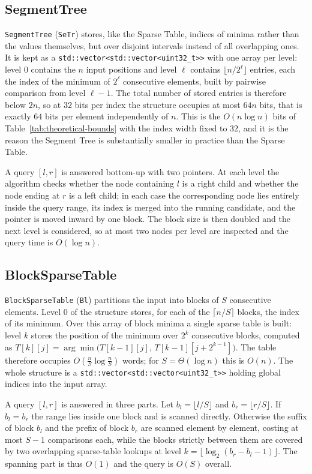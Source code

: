 \documentclass[a4paper,UKenglish,cleveref,thm-restate]{lipics-v2021}
\begin{document}
\subsection{SegmentTree}
\texttt{SegmentTree} (\texttt{SeTr}) stores, like the Sparse Table, indices of minima rather than the values themselves, but over disjoint intervals instead of all overlapping ones.
It is kept as a \texttt{std::vector<std::vector<uint32\_t>{}>} with one array per level:
level $0$ contains the $n$ input positions
and level $\ell$ contains $\lfloor n/2^\ell \rfloor$ entries,
each the index of the minimum of $2^\ell$ consecutive elements, built by pairwise comparison from level $\ell-1$.
The total number of stored entries is therefore below $2n$, so at $32$ bits per index the structure occupies at most $64n$ bits,
that is exactly $64$ bits per element independently of $n$.
This is the $O(n\log n)$ bits of Table~\ref{tab:theoretical-bounds} with the index width fixed to $32$,
and it is the reason the Segment Tree is substantially smaller in practice than the Sparse Table.

A query $[l,r]$ is answered bottom-up with two pointers.
At each level the algorithm checks whether the node containing $l$ is a right child and whether the node ending at $r$ is a left child;
in each case the corresponding node lies entirely inside the query range, its index is merged into the running candidate, and the pointer is moved inward by one block.
The block size is then doubled and the next level is considered, so at most two nodes per level are inspected and the query time is $O(\log n)$.

\subsection{BlockSparseTable}
\texttt{BlockSparseTable} (\texttt{Bl}) partitions the input into blocks of $S$ consecutive elements.
Level $0$ of the structure stores, for each of the $\lceil n/S\rceil$ blocks, the index of its minimum.
Over this array of block minima a single sparse table is built:
level $k$ stores the position of the minimum over $2^k$ consecutive blocks,
computed as $T[k][j]=\arg\min\big(T[k-1][j],\,T[k-1][j+2^{k-1}]\big)$.
The table therefore occupies $O\!\left(\frac{n}{S}\log\frac{n}{S}\right)$ words;
for $S=\Theta(\log n)$ this is $O(n)$.
The whole structure is a \texttt{std::vector<std::vector<uint32\_t>{}>} holding global indices into the input array.

A query $[l,r]$ is answered in three parts.
Let $b_l=\lfloor l/S\rfloor$ and $b_r=\lfloor r/S\rfloor$.
If $b_l=b_r$ the range lies inside one block and is scanned directly.
Otherwise the suffix of block $b_l$ and the prefix of block $b_r$ are scanned element by element, costing at most $S-1$ comparisons each,
while the blocks strictly between them are covered by two overlapping sparse-table lookups at level $k=\lfloor\log_2(b_r-b_l-1)\rfloor$.
The spanning part is thus $O(1)$ and the query is $O(S)$ overall.
\end{document}
